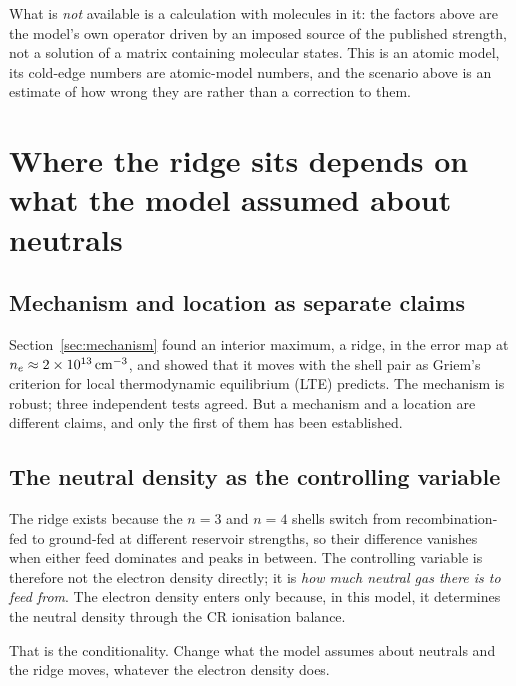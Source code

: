 What is \emph{not} available is a calculation with molecules in it: the factors
above are the model's own operator driven by an imposed source of the published
strength, not a solution of a matrix containing molecular states. This is an
atomic model, its cold-edge numbers are atomic-model numbers, and the scenario
above is an estimate of how wrong they are rather than a correction to them.

\section{Where the ridge sits depends on what the model assumed about neutrals}
\label{sec:ridge_conditional}

\subsection{Mechanism and location as separate claims}

Section~\ref{sec:mechanism} found an interior maximum, a ridge, in the
error map at $n_e \approx 2\times10^{13}\,\si{\per\cubic\centi\metre}$, and
showed that it moves with the shell pair as Griem's criterion for local
thermodynamic equilibrium (LTE) predicts. The mechanism is robust; three
independent tests agreed. But a mechanism and a location are different claims,
and only the first of them has been established.

\subsection{The neutral density as the controlling variable}

The ridge exists because the $n=3$ and $n=4$ shells switch from
recombination-fed to ground-fed at different reservoir strengths, so their
difference vanishes when either feed dominates and peaks in between. The
controlling variable is therefore not the electron density directly; it is
\emph{how much neutral gas there is to feed from}. The electron density enters
only because, in this model, it determines the neutral density through the CR
ionisation balance.

That is the conditionality. Change what the model assumes about neutrals and the
ridge moves, whatever the electron density does.

